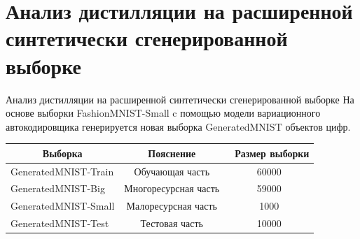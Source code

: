 \documentclass[10pt,pdf,hyperref={unicode}]{beamer}
\begin{document}
\section{Анализ дистилляции на расширенной синтетически сгенерированной выборке}
\begin{frame}{Анализ дистилляции на расширенной синтетически сгенерированной выборке}
\justifying
На основе выборки FashionMNIST-Small c помощью модели вариационного автокодировщика генерируется новая выборка GeneratedMNIST объектов цифр.


\begin{table}[h!t]
\begin{center}
\label{table_1}
\begin{tabular}{|c|c|c|}
\hline
	Выборка & Пояснение &\ Размер выборки\\
	\hline
	\multicolumn{1}{|l|}{GeneratedMNIST-Train}
	& Обучающая часть& 60000\\
	\hline
	\multicolumn{1}{|l|}{GeneratedMNIST-Big}
	& Многоресурсная часть& 59000\\
	\hline
	\multicolumn{1}{|l|}{GeneratedMNIST-Small}
	& Малоресурсная часть& 1000\\
	\hline
	\multicolumn{1}{|l|}{GeneratedMNIST-Test}
	& Тестовая часть& 10000\\

\hline

\end{tabular}
\end{center}
\end{table}

\end{frame}

\end{document}
